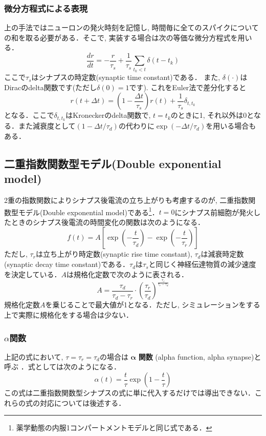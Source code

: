 \subsubsection{微分方程式による表現}
上の手法ではニューロンの発火時刻を記憶し, 時間毎に全てのスパイクについての和を取る必要がある．そこで, 実装する場合は次の等価な微分方程式を用いる．
\begin{equation}
\frac{dr}{dt}=-\frac{r}{\tau_{s}}+\frac{1}{\tau_{s}} \sum_{t_{k}< t} \delta\left(t-t_{k}\right)   
\end{equation}
ここで$\tau_s$はシナプスの時定数(synaptic time constant)である． また, $\delta(\cdot)$はDiracのdelta関数です(ただし$\delta(0)=1$です). これをEuler法で差分化すると 
\begin{equation}
r(t+\Delta t)=\left(1-\frac{\Delta t}{\tau_{s}}\right)r(t)+\frac{1}{\tau_{s}}\delta_{t,t_{k}} 
\end{equation}
となる．ここで$\delta_{t,t_{k}}$はKroneckerのdelta関数で, $t=t_{k}$のときに1, それ以外は0となる．また減衰度として$\left(1-\Delta  t/\tau_{d}\right)$の代わりに$\exp\left(-\Delta t/\tau_{d}\right)$を用いる場合もある．
\subsection{二重指数関数型モデル(Double exponential model)}
2重の指数関数によりシナプス後電流の立ち上がりも考慮するのが, 二重指数関数型モデル(Double exponential model)である\footnote{薬学動態の内服1コンパートメントモデルと同じ式である．}．$t=0$にシナプス前細胞が発火したときのシナプス後電流の時間変化の関数は次のようになる．
\begin{equation}
f(t)=A\left[\exp\left(-\frac{t}{\tau_d}\right)-\exp\left(-\frac{t}{\tau_r}\right)\right]    
\end{equation}
ただし, ${\tau_r}$は立ち上がり時定数(synaptic rise time constant), ${\tau_d}$は減衰時定数(synaptic decay time constant)である．$\tau_{d}$は$\tau_{s}$と同じく神経伝達物質の減少速度を決定している．$A$は規格化定数で次のように表される．
\begin{equation}
A=\frac{\tau_d}{\tau_d-\tau_r}\cdot \left(\frac{\tau_r}{\tau_d}\right)^\frac{\tau_r}{\tau_r-\tau_d}    
\end{equation}
規格化定数$A$を乗じることで最大値が1となる．ただし, シミュレーションをする上で実際に規格化をする場合は少ない．
\subsubsection{$\alpha$関数}
上記の式において, $\tau=\tau_{r}=\tau_{d}$の場合は $\boldsymbol{\alpha}$ \textbf{関数} (alpha function, alpha synapse)と呼ぶ \citep{Rall1967-gn}．式としては次のようになる．
\begin{equation}
\alpha(t)=\frac{t}{\tau}\exp\left(1-\frac{t}{\tau}\right)    
\end{equation}
この式は二重指数関数型シナプスの式に単に代入するだけでは導出できない．これらの式の対応については後述する．
